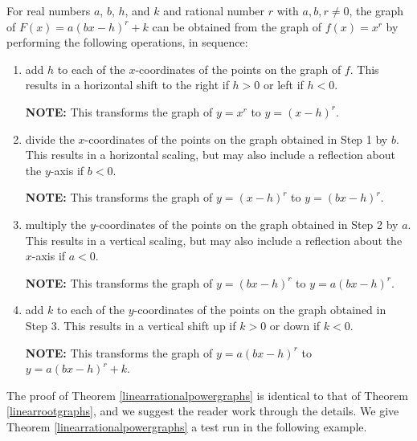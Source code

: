 \documentclass{ximera}
\begin{document}
\begin{theorem} \label{linearrationalpowergraphs}  For real numbers $a$, $b$, $h$, and $k$ and rational number $r$ with $a, b, r \neq 0$, the graph of $F(x) = a(bx-h)^r +k$  can be obtained from the graph of $f(x) = x^r$ by performing the following operations, in sequence:

\begin{enumerate}

\item  add $h$ to each of the $x$-coordinates of the points on the graph of $f$.  This results in a horizontal shift to the right if $h > 0$ or left if $h < 0$.

\textbf{NOTE:}  This transforms the graph of $y =x^{r}$ to $y = (x-h)^{r}$.

\item  divide the $x$-coordinates of the points on the graph obtained in Step 1 by $b$.  This results in a horizontal scaling, but may also include a reflection about the $y$-axis if $b < 0$.

\textbf{NOTE:}  This transforms the graph of $y = (x-h)^{r}$ to $y = (bx-h)^{r}$.

\item  multiply the $y$-coordinates of the points on the graph obtained in Step 2 by $a$.   This results in a vertical scaling, but may also include a reflection about the $x$-axis if $a < 0$.

\textbf{NOTE:}  This transforms the graph of $y = (bx-h)^{r}$ to $y = a(bx-h)^{r}$.

\item  add $k$ to each of the $y$-coordinates of the points on the graph obtained in Step 3.  This results in a vertical shift up if $k > 0$ or down if $k< 0$.

\textbf{NOTE:}  This transforms the graph of $y = a(bx-h)^{r}$ to $y = a(bx-h)^{r}+k$.

\end{enumerate}

\end{theorem}


 

The proof of Theorem \ref{linearrationalpowergraphs} is identical to that of Theorem \ref{linearrootgraphs}, and we suggest the reader work through the details.  We give Theorem \ref{linearrationalpowergraphs}  a test run in the following example.
\end{document}
